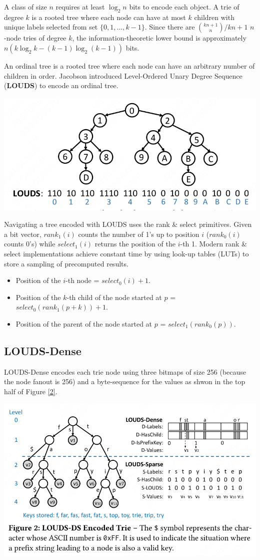 \documentclass[11pt]{article}
\begin{document}
A class of size \(n\) requires at least \(\log_2n\) bits to encode each object. A trie of degree \(k\)
is a rooted tree where each node can have at most \(k\) children with unique labels selected from set
\(\{0,1,\dots,k-1\}\). Since there are \(\binom{kn+1}{n}/kn+1\) \(n\)-node tries of degree \(k\), the
information-theoretic lower bound is approximately \(n(k\log_2k-(k-1)\log_2(k-1))\) bits.

An ordinal tree is a rooted tree where each node can have an arbitrary number of children in order.
Jacobson introduced Level-Ordered Unary Degree Sequence (\textbf{LOUDS}) to encode an ordinal tree.
\begin{center}
\includegraphics[width=.7\textwidth]{../../images/papers/33.png}
\end{center}

Navigating a tree encoded with LOUDS uses the rank \& select primitives. Given a bit vector,
\(rank_1(i)\) counts the number of 1's up to position \(i\) (\(rank_0(i)\) counts 0's) while
\(select_1(i)\) returns the position of the \(i\)-th 1. Modern rank \& select implementations achieve
constant time by using look-up tables (LUTs) to store a sampling of precomputed results.
\begin{itemize}
\item Position of the \(i\)-th node = \(select_0(i)+1\).
\item Position of the \(k\)-th child of the node started at \(p\) = \(select_0(rank_1(p+k))+1\).
\item Position of the parent of the node started at \(p\) = \(select_1(rank_0(p))\).
\end{itemize}
\subsection{LOUDS-Dense}
\label{sec:org892a8ff}
LOUDS-Dense encodes each trie node using three bitmaps of size 256 (because the node fanout is 256)
and a byte-sequence for the values as shwon in the top half of Figure \ref{2}.
\begin{center}
\includegraphics[width=.7\textwidth]{../../images/papers/34.png}
\label{2}
\end{center}
\end{document}
